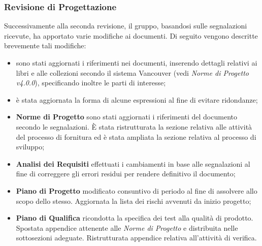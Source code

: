 \subsubsection{Revisione di Progettazione}
Successivamente alla seconda revisione, il gruppo, basandosi sulle 
segnalazioni ricevute, ha apportato varie modifiche ai documenti. 
Di seguito vengono descritte brevemente tali modifiche:
\begin{itemize}
	\item sono stati aggiornati i riferimenti nei documenti, inserendo dettagli relativi ai libri e alle collezioni secondo il sistema Vancouver (vedi \textit{Norme di Progetto v4.0.0}), specificando inoltre le parti di interesse;
	\item è stata aggiornata la forma di alcune espressioni al fine di evitare ridondanze;
	\item \textbf{Norme di Progetto} sono stati aggiornati i riferimenti del documento secondo le segnalazioni. \`E stata ristrutturata la sezione relativa alle attività del processo di fornitura ed è stata ampliata la sezione relativa al processo di sviluppo;
	\item \textbf{Analisi dei Requisiti} effettuati i cambiamenti in base alle segnalazioni al fine di correggere gli errori residui per rendere definitivo il documento;
	\item \textbf{Piano di Progetto} modificato consuntivo di periodo al fine di assolvere allo scopo dello stesso. Aggiornata la lista dei rischi avvenuti da inizio progetto;
	\item \textbf{Piano di Qualifica} ricondotta la specifica dei test alla qualità di prodotto. Spostata appendice attenente alle \textit{Norme di Progetto} e distribuita nelle sottosezioni adeguate. Ristrutturata appendice relativa all'attività di verifica.
\end{itemize}

